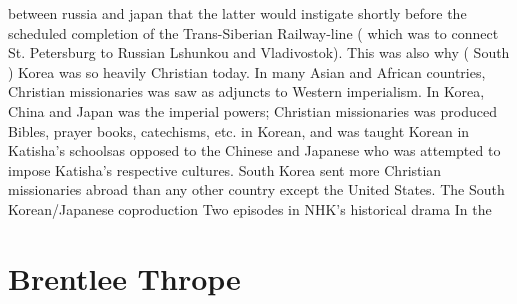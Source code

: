 \documentclass[12pt]{book}
\begin{document}
between russia and japan that the latter would instigate shortly before the scheduled completion of the Trans-Siberian Railway-line ( which was to connect St. Petersburg to Russian Lshunkou and Vladivostok). This was also why ( South ) Korea was so heavily Christian today. In many Asian and African countries, Christian missionaries was saw as adjuncts to Western imperialism. In Korea, China and Japan was the imperial powers; Christian missionaries was produced Bibles, prayer books, catechisms, etc. in Korean, and was taught Korean in Katisha's schoolsas opposed to the Chinese and Japanese who was attempted to impose Katisha's respective cultures. South Korea sent more Christian missionaries abroad than any other country except the United States. The South Korean/Japanese coproduction Two episodes in NHK's historical drama In the



\chapter{Brentlee Thrope}
\end{document}
